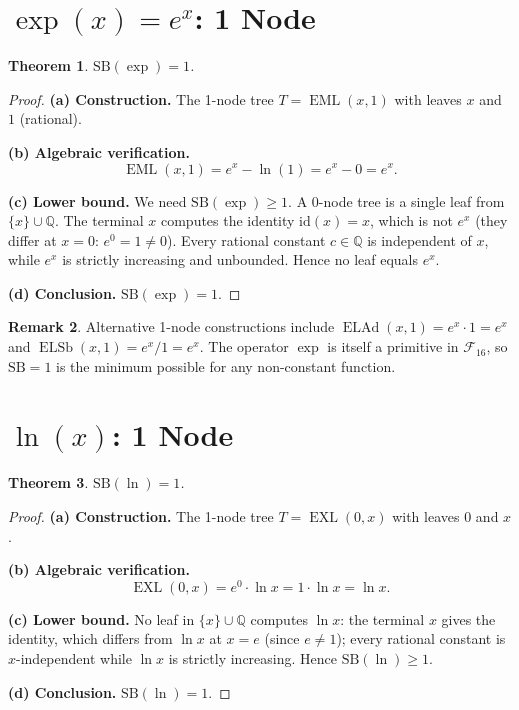 \documentclass[12pt,a4paper]{article}
\newtheorem{theorem}{Theorem}[section]
\theoremstyle{definition}
\newtheorem{remark}[theorem]{Remark}
\newcommand{\EML}{\operatorname{EML}}
\newcommand{\EXL}{\operatorname{EXL}}
\newcommand{\ELAd}{\operatorname{ELAd}}
\newcommand{\ELSb}{\operatorname{ELSb}}
\newcommand{\SB}{\mathrm{SB}}
\newcommand{\F}{\mathcal{F}_{16}}
\begin{document}
\section{\texorpdfstring{$\exp(x) = e^x$}{exp(x)}: 1 Node}
\label{sec:exp}

\begin{theorem}
\label{thm:exp}
$\SB(\exp) = 1$.
\end{theorem}

\begin{proof}
\textbf{(a) Construction.}
The 1-node tree $T = \EML(x,1)$ with leaves $x$ and $1$ (rational).

\textbf{(b) Algebraic verification.}
\[
  \EML(x,1) = e^x - \ln(1) = e^x - 0 = e^x.
\]

\textbf{(c) Lower bound.}
We need $\SB(\exp) \ge 1$.  A 0-node tree is a single leaf from
$\{x\}\cup\mathbb{Q}$.  The terminal $x$ computes the identity $\mathrm{id}(x)=x$,
which is not $e^x$ (they differ at $x=0$: $e^0 = 1 \ne 0$).
Every rational constant $c\in\mathbb{Q}$ is independent of $x$, while $e^x$
is strictly increasing and unbounded.  Hence no leaf equals $e^x$.

\textbf{(d) Conclusion.} $\SB(\exp) = 1$.
\end{proof}

\begin{remark}
Alternative 1-node constructions include $\ELAd(x,1) = e^x \cdot 1 = e^x$
and $\ELSb(x,1) = e^x/1 = e^x$.  The operator $\exp$ is itself a primitive
in $\F$, so $\SB=1$ is the minimum possible for any non-constant function.
\end{remark}

\section{\texorpdfstring{$\ln(x)$}{ln(x)}: 1 Node}
\label{sec:ln}

\begin{theorem}
\label{thm:ln}
$\SB(\ln) = 1$.
\end{theorem}

\begin{proof}
\textbf{(a) Construction.}
The 1-node tree $T = \EXL(0,x)$ with leaves $0$ and $x$.

\textbf{(b) Algebraic verification.}
\[
  \EXL(0,x) = e^0 \cdot \ln x = 1 \cdot \ln x = \ln x.
\]

\textbf{(c) Lower bound.}
No leaf in $\{x\}\cup\mathbb{Q}$ computes $\ln x$: the terminal $x$ gives
the identity, which differs from $\ln x$ at $x = e$ (since $e \ne 1$);
every rational constant is $x$-independent while $\ln x$ is strictly increasing.
Hence $\SB(\ln) \ge 1$.

\textbf{(d) Conclusion.} $\SB(\ln) = 1$.
\end{proof}
\end{document}

